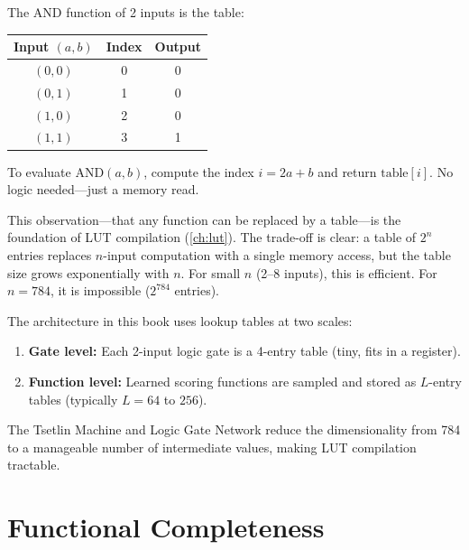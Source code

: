 \begin{example}
The AND function of 2 inputs is the table:

\begin{center}
\begin{tabular}{@{}cc|c@{}}
  \toprule
  \textbf{Input $(a,b)$} & \textbf{Index} & \textbf{Output} \\
  \midrule
  $(0,0)$ & 0 & 0 \\
  $(0,1)$ & 1 & 0 \\
  $(1,0)$ & 2 & 0 \\
  $(1,1)$ & 3 & 1 \\
  \bottomrule
\end{tabular}
\end{center}

To evaluate AND$(a,b)$, compute the index $i = 2a + b$ and return
$\text{table}[i]$. No logic needed---just a memory read.
\end{example}

This observation---that any function can be replaced by a table---is
the foundation of LUT compilation (\cref{ch:lut}). The trade-off is
clear: a table of $2^n$ entries replaces $n$-input computation with a
single memory access, but the table size grows exponentially with
$n$. For small $n$ (2--8 inputs), this is efficient. For $n = 784$,
it is impossible ($2^{784}$ entries).

\begin{keyinsight}
The architecture in this book uses lookup tables at two scales:
\begin{enumerate}
  \item \textbf{Gate level:} Each 2-input logic gate is a 4-entry
    table (tiny, fits in a register).
  \item \textbf{Function level:} Learned scoring functions are sampled
    and stored as $L$-entry tables (typically $L = 64$ to $256$).
\end{enumerate}
The Tsetlin Machine and Logic Gate Network reduce the
dimensionality from 784 to a manageable number of intermediate
values, making LUT compilation tractable.
\end{keyinsight}


\section{Functional Completeness}
\label{sec:completeness}

